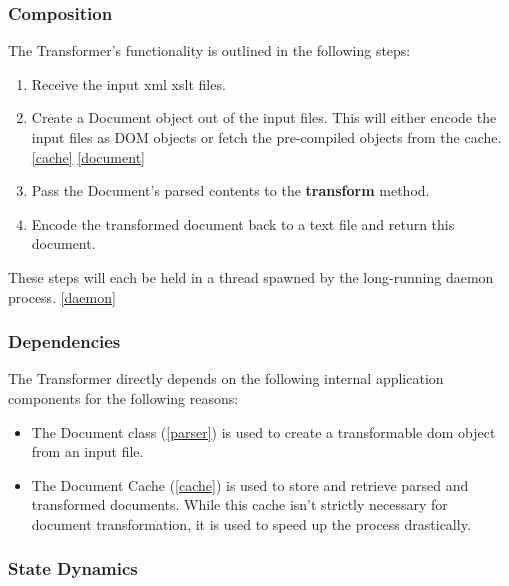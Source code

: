 \begin{enmerate}
\subsubsection{Composition}

The Transformer's functionality is outlined in the following steps:

\begin{enumerate}
  \item Receive the input \gls{xml} \gls{xslt} files.
  \item Create a Document object out of the input files. This will either encode the input files as DOM objects or fetch the pre-compiled objects from the cache. \ref{cache} \ref{document}
  \item Pass the Document's parsed contents to the \cite{xalan-library} \textbf{transform} method.
  \item Encode the transformed document back to a text file and return this document.
\end{enumerate}

These steps will each be held in a thread spawned by the long-running daemon process. \ref{daemon}

\subsubsection{Dependencies}

The Transformer directly depends on the following internal application components for the following reasons:

\begin{itemize}
  \item {
      The Document class (\ref{parser}) is used to create a transformable \gls{dom} object from an input file. \cite{dom-spec}
  }
  \item {
    The Document Cache (\ref{cache}) is used to store and retrieve parsed and transformed documents.
    While this cache isn't strictly necessary for document transformation, it is used to speed up the process drastically.
  }
\end{itemize}

\subsubsection{State Dynamics}


\end{enmerate}
